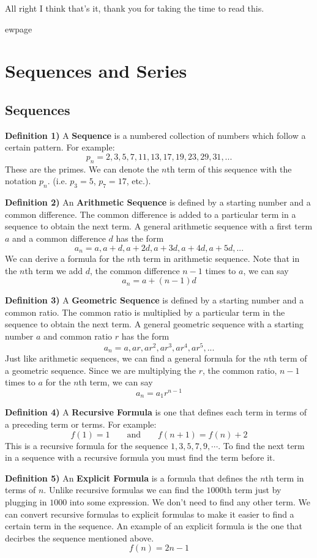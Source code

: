 \documentclass[a4paper]{article}
\begin{document}
All right I think that's it, thank you for taking the time to read this.

\vfill
{}


ewpage
\section{Sequences and Series}
\subsection{Sequences}

\textbf{Definition 1)} A \textbf{Sequence} is a numbered collection of numbers which follow a certain pattern. For example:
$$p_n = 2, 3, 5, 7, 11, 13, 17, 19, 23, 29, 31, ... $$
These are the primes. We can denote the $n$th term of this sequence with the notation $p_n$. (i.e. 
$p_3=5$, $p_7=17$, etc.).

\textbf{Definition 2)} An \textbf{Arithmetic Sequence} is defined by a starting number and a common difference. The common difference is added to a particular term in a sequence to obtain the next term. A general arithmetic sequence with a first term $a$ and a common difference $d$ has the form
$$a_n = a, a+d, a+2d, a+3d, a+4d, a+5d, ...$$
We can derive a formula for the $n$th term in arithmetic sequence. Note that in the $n$th term we add $d$, the common difference $n-1$ times to $a$, we can say
$$a_n=a+(n-1)d$$

\textbf{Definition 3)} A \textbf{Geometric Sequence} is defined by a starting number and a common ratio. 
The common ratio is  multiplied by a particular term in the sequence to obtain the next term. A general 
geometric sequence with a starting number $a$ and common ratio $r$ has the form
$$a_n=a, ar, ar^2, ar^3, ar^4, ar^5, ...$$
Just like arithmetic sequences, we can find a general formula for the $n$th term of a geometric sequence.
Since we are multiplying the $r$, the common ratio, $n-1$ times to $a$ for the $n$th term, we can say
$$a_n=a_1r^{n-1}$$

\textbf{Definition 4)} A \textbf{Recursive Formula} is one that defines each term in terms of a preceding term or terms. For example:
$$f(1)=1 \qquad \text{and} \qquad f(n+1)=f(n)+2$$
This is a recursive formula for the sequence $1, 3, 5, 7, 9, \cdots$. To find the next term in a sequence with a recursive formula you must find the term before it.

\textbf{Definition 5)} An \textbf{Explicit Formula} is a formula that defines the $n$th term in terms of $n$. Unlike recursive formulas we can find the $1000$th term just by plugging in $1000$ into some expression. We don't need to find any other term. We can convert recursive formulas to explicit formulas to make it easier to find a certain term in the sequence. An example of an explicit formula is the one that decirbes the sequence mentioned above.
$$f(n)=2n-1$$
\end{document}
